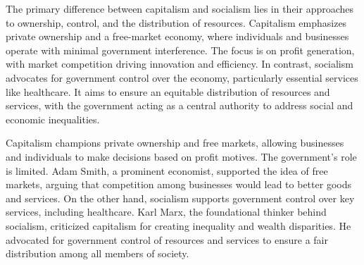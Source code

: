 \par 
The primary difference between capitalism and socialism lies in their approaches to ownership, control, and the distribution of resources. Capitalism emphasizes private ownership and a free-market economy, where individuals and businesses operate with minimal government interference. The focus is on profit generation, with market competition driving innovation and efficiency. In contrast, socialism advocates for government control over the economy, particularly essential services like healthcare. It aims to ensure an equitable distribution of resources and services, with the government acting as a central authority to address social and economic inequalities.

\par
Capitalism champions private ownership and free markets, allowing businesses and individuals to make decisions based on profit motives. The government's role is limited. Adam Smith, a prominent economist, supported the idea of free markets, arguing that competition among businesses would lead to better goods and services. On the other hand, socialism supports government control over key services, including healthcare. Karl Marx, the foundational thinker behind socialism, criticized capitalism for creating inequality and wealth disparities. He advocated for government control of resources and services to ensure a fair distribution among all members of society.